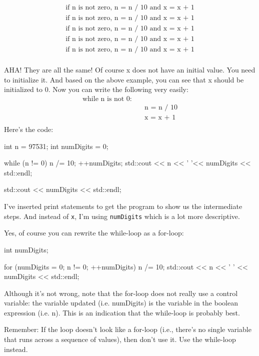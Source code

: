 \begin{align*}
\text{if n is not zero, n = n / 10 and x = x + 1}\\
\text{if n is not zero, n = n / 10 and x = x + 1}\\
\text{if n is not zero, n = n / 10 and x = x + 1}\\
\text{if n is not zero, n = n / 10 and x = x + 1}\\
\text{if n is not zero, n = n / 10 and x = x + 1}\\
\end{align*}

AHA! They are all the same! Of course x does not have an initial value.
You need to initialize it. And based on the above example, you can see
that x should be initialized to 0. Now you can write the following very
easily:
\begin{align*}
\text{while n is not 0:}\\
&\quad\text{n = n / 10}\\
&\quad\text{x = x + 1}\\
\end{align*}
Here's the code:

\begin{console}
int n = 97531;
int numDigits = 0;

while (n != 0)
{     
      n /= 10;
      ++numDigits;
      std::cout << n << ' '<< numDigits << std::endl;
}

std::cout << numDigits << std::endl; 
\end{console}

I've inserted print statements to get the program to show us the intermediate steps. And instead of \texttt{x}, I'm using \texttt{numDigits} which is a lot more descriptive.

Yes, of course you can rewrite the while-loop as a for-loop:

\begin{console}
int numDigits;

for (numDigits = 0; n != 0; ++numDigits)
{   
    n /= 10;
    std::cout << n << ' ' << numDigits << std::endl;
} 
\end{console}

Although it's not wrong, note that the for-loop does not really use a control variable: the variable updated (i.e. numDigits) is the variable in the boolean expression (i.e. n). This is an indication that the while-loop is probably best.

Remember: If the loop doesn't look like a for-loop
(i.e., there's no single variable that runs across a
sequence of values), then don't use it. Use the
while-loop instead.

